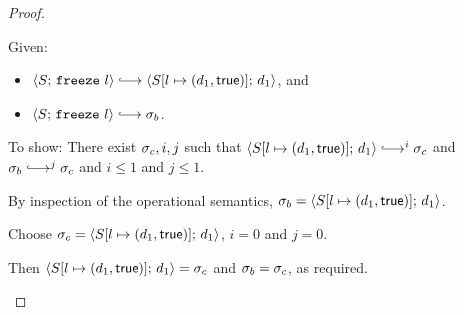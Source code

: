 \begin{proof}
\begin{itemize}
      Given:
      \begin{itemize}
      \item $\config{S}{\freeze{l}} \parstepsto
        \config{\extS{S}{l}{d_1}{\frozentrue}}{d_1}$, and
      \item $\config{S}{\freeze{l}} \parstepsto \conf_b$.
      \end{itemize}

      To show: There exist $\sigma_c, i, j$ such that
      $\config{\extS{S}{l}{d_1}{\frozentrue}}{d_1} \parstepsto^i
      \conf_c$ and $\conf_b \parstepsto^j \conf_c$ and $i \leq 1$ and
      $j \leq 1$.

      By inspection of the operational semantics, $\sigma_b =
      \langle S[l \mapsto (d_1, \textsf{true})];\, d_1 \rangle$.

      Choose $\sigma_c = \langle S[l \mapsto (d_1, \textsf{true})];\, d_1 \rangle$,
      $i = 0$ and $j = 0$.

      Then $\langle S[l \mapsto (d_1, \textsf{true})];\, d_1 \rangle = \sigma_c$ and
      $\sigma_b = \sigma_c$, as required.
  \end{itemize}
\end{proof}

